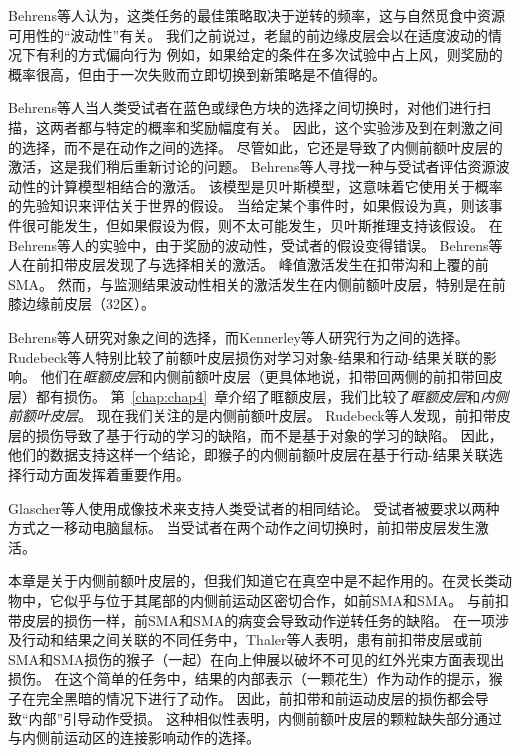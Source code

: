 Behrens等人\cite{behrens2007learning}认为，这类任务的最佳策略取决于逆转的频率，这与自然觅食中资源可用性的“波动性”有关。
我们之前说过，老鼠的前边缘皮层会以在适度波动的情况下有利的方式偏向行为
例如，如果给定的条件在多次试验中占上风，则奖励的概率很高，但由于一次失败而立即切换到新策略是不值得的。\par


Behrens等人当人类受试者在蓝色或绿色方块的选择之间切换时，对他们进行扫描，这两者都与特定的概率和奖励幅度有关。
因此，这个实验涉及到在刺激之间的选择，而不是在动作之间的选择。
尽管如此，它还是导致了内侧前额叶皮层的激活，这是我们稍后重新讨论的问题。
Behrens等人寻找一种与受试者评估资源波动性的计算模型相结合的激活。
该模型是贝叶斯模型，这意味着它使用关于概率的先验知识来评估关于世界的假设。
当给定某个事件时，如果假设为真，则该事件很可能发生，但如果假设为假，则不太可能发生，贝叶斯推理支持该假设。
在Behrens等人的实验中，由于奖励的波动性，受试者的假设变得错误。
Behrens等人在前扣带皮层发现了与选择相关的激活。
峰值激活发生在扣带沟和上覆的前SMA。
然而，与监测结果波动性相关的激活发生在内侧前额叶皮层，特别是在前膝边缘前皮层（32区）。\par


Behrens等人研究对象之间的选择，而Kennerley等人研究行为之间的选择。
Rudebeck等人\cite{rudebeck2008frontal}特别比较了前额叶皮层损伤对学习对象-结果和行动-结果关联的影响。
他们在\textit{眶额皮层}和内侧前额叶皮层（更具体地说，扣带回两侧的前扣带回皮层）都有损伤。
第~\ref{chap:chap4}~章介绍了眶额皮层，我们比较了\textit{眶额皮层}和\textit{内侧前额叶皮层}。
现在我们关注的是内侧前额叶皮层。
Rudebeck等人发现，前扣带皮层的损伤导致了基于行动的学习的缺陷，而不是基于对象的学习的缺陷。
因此，他们的数据支持这样一个结论，即猴子的内侧前额叶皮层在基于行动-结果关联选择行动方面发挥着重要作用。\par
Glascher等人\cite{glascher2009determining}使用成像技术来支持人类受试者的相同结论。
受试者被要求以两种方式之一移动电脑鼠标。
当受试者在两个动作之间切换时，前扣带皮层发生激活。\par
本章是关于内侧前额叶皮层的，但我们知道它在真空中是不起作用的。在灵长类动物中，它似乎与位于其尾部的内侧前运动区密切合作，如前SMA和SMA。
与前扣带皮层的损伤一样\cite{kennerley2006optimal}，前SMA和SMA的病变会导致动作逆转任务的缺陷\cite{chen1995functions}。
在一项涉及行动和结果之间关联的不同任务中，Thaler等人\cite{thaler1995functions}表明，患有前扣带皮层或前SMA和SMA损伤的猴子（一起）在向上伸展以破坏不可见的红外光束方面表现出损伤。
在这个简单的任务中，结果的内部表示（一颗花生）作为动作的提示，猴子在完全黑暗的情况下进行了动作。
因此，前扣带和前运动皮层的损伤都会导致“内部”引导动作受损。
这种相似性表明，内侧前额叶皮层的颗粒缺失部分通过与内侧前运动区的连接影响动作的选择。\par



